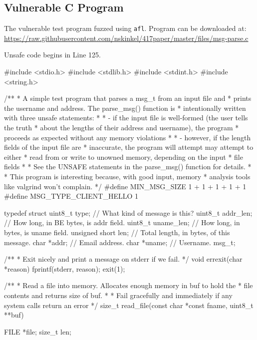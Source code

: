\begin{appendices}

\chapter{Vulnerable C Program}
\label{app:vuln-full}

The vulnerable test program fuzzed using \texttt{afl}. Program can be
downloaded at: \url{https://raw.githubusercontent.com/nskinkel/417paper/master/files/msg-parse.c}

Unsafe code begins in Line 125.

\renewcommand\mylstcaption{Caption goes here.}
\begin{TCBlisting}[language={[ANSI]C},basicstyle=\scriptsize,caption={\mylstcaption}]
#include <stdio.h>
#include <stdlib.h>
#include <stdint.h>
#include <string.h>

/**
 * A simple test program that parses a msg_t from an input file and 
 * prints the username and address. The parse_msg() function is
 * intentionally written with three unsafe statements:
 *
 *     - if the input file is well-formed (the user tells the truth
 *       about the lengths of their address and username), the program
 *       proceeds as expected without any memory violations
 *
 *     - however, if the length fields of the input file are
 *       inaccurate, the program will attempt may attempt to either
 *       read from or write to unowned memory, depending on the input
 *       file fields
 *
 * See the UNSAFE statements in the parse_msg() function for details.
 *
 * This program is interesting because, with good input, memory
 * analysis tools like valgrind won't complain.
 */
#define MIN_MSG_SIZE 1 + 1 + 1 + 1 + 1
#define MSG_TYPE_CLIENT_HELLO 1

typedef struct {
    uint8_t type;       // What kind of message is this?
    uint8_t addr_len;   // How long, in BE bytes, is addr field.
    uint8_t uname_len;  // How long, in bytes, is uname field.
    unsigned short len; // Total length, in bytes, of this message.
    char *addr;         // Email address.
    char *uname;        // Username.
} msg_t;

/**
 * Exit nicely and print a message on stderr if we fail.
 */
void
errexit(char *reason) {
    fprintf(stderr, reason);
    exit(1);
}

/**
 * Read a file into memory. Allocates enough memory in buf to hold the
 * file contents and returns size of buf.
 *
 * Fail gracefully and immediately if any system calls return an error
 */
size_t
read_file(const char *const fname, uint8_t **buf) {
   	FILE *file;
	size_t len;

}
\end{TCBlisting}
\end{appendices}
